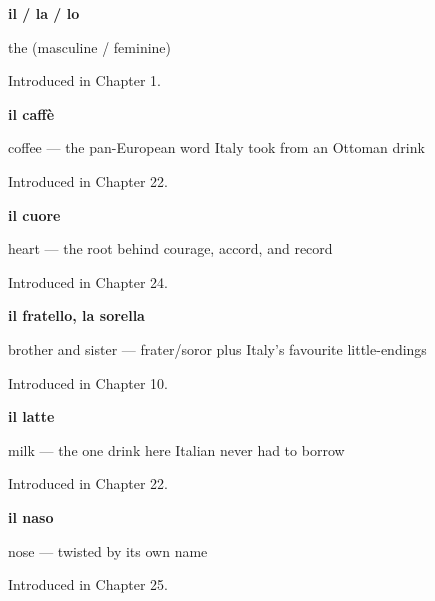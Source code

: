 \noindent\begin{minipage}[t]{\linewidth}
\raggedright
\textbf{il / la / lo}\par
\small the (masculine / feminine)\par
\footnotesize Introduced in Chapter 1.
\end{minipage}\par\medskip

\noindent\begin{minipage}[t]{\linewidth}
\raggedright
\textbf{il caffè}\par
\small coffee — the pan-European word Italy took from an Ottoman drink\par
\footnotesize Introduced in Chapter 22.
\end{minipage}\par\medskip

\noindent\begin{minipage}[t]{\linewidth}
\raggedright
\textbf{il cuore}\par
\small heart — the root behind courage, accord, and record\par
\footnotesize Introduced in Chapter 24.
\end{minipage}\par\medskip

\noindent\begin{minipage}[t]{\linewidth}
\raggedright
\textbf{il fratello, la sorella}\par
\small brother and sister — frater/soror plus Italy's favourite little-endings\par
\footnotesize Introduced in Chapter 10.
\end{minipage}\par\medskip

\noindent\begin{minipage}[t]{\linewidth}
\raggedright
\textbf{il latte}\par
\small milk — the one drink here Italian never had to borrow\par
\footnotesize Introduced in Chapter 22.
\end{minipage}\par\medskip

\noindent\begin{minipage}[t]{\linewidth}
\raggedright
\textbf{il naso}\par
\small nose — twisted by its own name\par
\footnotesize Introduced in Chapter 25.
\end{minipage}\par\medskip

